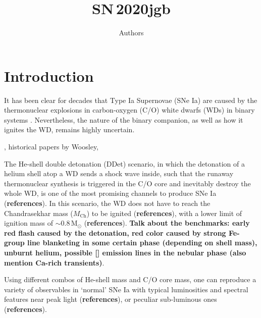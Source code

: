 \documentclass[twocolumn]{aastex631}
\newcommand{\sn}{SN\,2020jgb}
\newcommand{\Mch}{$M_\mathrm{Ch}$}
\begin{document}
\title{\sn}

\author{Authors}

\begin{abstract}

\end{abstract}


\section{Introduction} \label{sec:intro}
It has been clear for decades that Type Ia Supernovae (SNe Ia) are caused by the thermonuclear explosions in carbon-oxygen (C/O) white dwarfs (WDs) in binary systems \citep[see][for a review]{Maoz_2014}. Nevertheless, the nature of the binary companion, as well as how it ignites the WD, remains highly uncertain. 

\citep{polin_observational_2019}, historical papers by Woosley, \citep{Boyle2017_Helium}

The He-shell double detonation (DDet) scenario, in which the detonation of a helium shell atop a WD sends a shock wave inside, such that the runaway thermonuclear synthesis is triggered in the C/O core and inevitably destroy the whole WD, is one of the most promising channels to produce SNe Ia (\textbf{references}). In this scenario, the WD does not have to reach the Chandrasekhar mass (\Mch) to be ignited (\textbf{references}), with a lower limit of ignition mass of $\sim$0.8\,$\mathrm{M_\odot}$ (\textbf{references}). \textbf{Talk about the benchmarks: early red flash caused by the detonation, red color caused by strong Fe-group line blanketing in some certain phase (depending on shell mass), unburnt helium, possible [] emission lines in the nebular phase (also mention Ca-rich transients)}.

Using different combos of He-shell mass and C/O core mass, one can reproduce a variety of observables in `normal' SNe Ia with typical luminosities and spectral features near peak light (\textbf{references}), or peculiar sub-luminous ones (\textbf{references}). 
\end{document}
